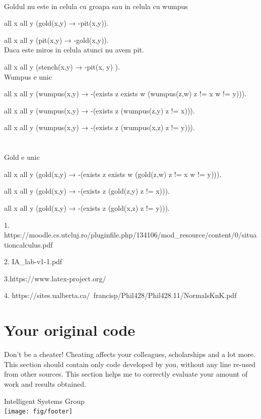 \documentclass[a4paper,12pt]{report}
\begin{document}
\\

Goldul nu este in celula cu groapa sau in celula cu wumpus

all x all y (gold(x,y) → -pit(x,y)).

all x all y (pit(x,y) → -gold(x,y)).
\\

Daca este miros in celula atunci nu avem pit.

all x all y (stench(x,y) → -pit(x, y) ).
\\

Wumpus e unic

all x all y (wumpus(x,y) → -(exists z exists w (wumpus(z,w) z != x w != y))).

all x all y (wumpus(x,y) → -(exists z (wumpus(z,y) z != x))).

all x all y (wumpus(x,y) → -(exists z (wumpus(x,z) z != y))).
\\
\\
\\

Gold e unic

all x all y (gold(x,y) → -(exists z exists w (gold(z,w) z != x w != y))).

all x all y (gold(x,y) → -(exists z (gold(z,y) z != x))).

all x all y (gold(x,y) → -(exists z (gold(x,z) z != y))).



1. https://moodle.cs.utcluj.ro/pluginfile.php/134106/mod_resource/content/0/situationcalculus.pdf

2. IA_lab-v1-1.pdf

3.https://www.latex-project.org/

4. https://sites.ualberta.ca/~francisp/Phil428/Phil428.11/NormalsKnK.pdf
\appendix

\chapter{Your original code}
Don't be a cheater! Cheating affects your colleagues, scholarships and a lot more.
This section should contain only code developed by you, without any line re-used from other sources. 
This section helps me to correctly evaluate your amount of work and results obtained. 


\vspace{2cm}
 
\begin{center}
Intelligent Systems Group\\
\texttt{[image: fig/footer]}
\end{center}
\end{document}
